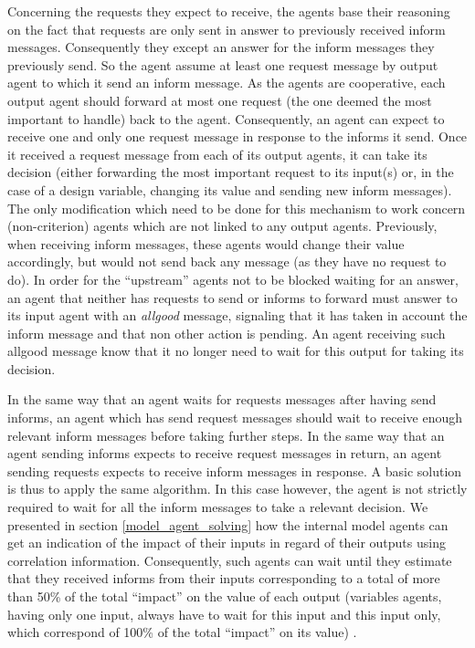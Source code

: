 Concerning the requests they expect to receive, the agents base their reasoning on the fact that requests are only sent in answer to previously received inform messages. Consequently they except an answer for the inform messages they previously send. So the agent assume at least one request message by output agent to which it send an inform message. As the agents are cooperative, each output agent should forward at most one request (the one deemed the most important to handle) back to the agent. Consequently, an agent can expect to receive one and only one request message in response to the informs it send. Once it received a request message from each of its output agents, it can take its decision (either forwarding the most important request to its input(s) or, in the case of a design variable, changing its value and sending new inform messages).\\
The only modification which need to be done for this mechanism to work concern (non-criterion) agents which are not linked to any output agents. Previously, when receiving inform messages, these agents would change their value accordingly, but would not send back any message (as they have no request to do). In order for the \enquote{upstream} agents not to be blocked waiting for an answer, an agent that neither has requests to send or informs to forward must answer to its input agent with an \emph{allgood} message, signaling that it has taken in account the inform message and that non other action is pending. An agent receiving such allgood message know that it no longer need to wait for this output for taking its decision.

In the same way that an agent waits for requests messages after having send informs, an agent which has send request messages should wait to receive enough relevant inform messages before taking further steps. In the same way that an agent sending informs expects to receive request messages in return, an agent sending requests expects to receive inform messages in response. A basic solution is thus to apply the same algorithm. In this case however, the agent is not strictly required to wait for all the inform messages to take a relevant decision. We presented in section \ref{model_agent_solving} how the internal model agents can get an indication of the impact of their inputs in regard of their outputs using correlation information. Consequently, such agents can wait until they estimate that they received informs from their inputs corresponding to a total of more than 50\% of the total \enquote{impact} on the value of each output (variables agents, having only one input, always have to wait for this input and this input only, which correspond of 100\% of the total \enquote{impact} on its value) .



